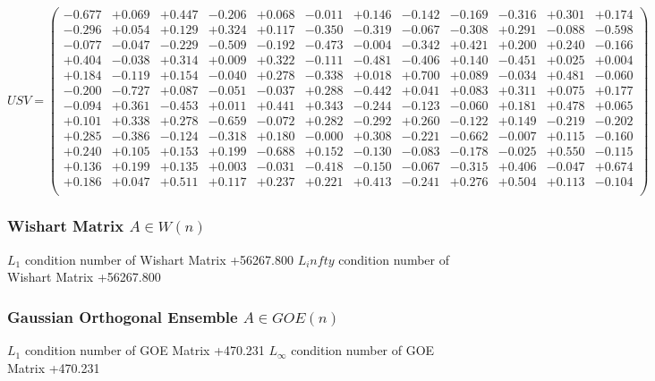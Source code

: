 \documentclass[9pt]{article}
\theoremstyle{plain}
\theoremstyle{definition}
\theoremstyle{remark}
\numberwithin{equation}{section}
\begin{document}
$U S V = \left(
\begin{array}{
cccccccccccc}
-0.677 & +0.069 & +0.447 & -0.206 & +0.068 & -0.011 & +0.146 & -0.142 & -0.169 & -0.316 & +0.301 & +0.174 \\
-0.296 & +0.054 & +0.129 & +0.324 & +0.117 & -0.350 & -0.319 & -0.067 & -0.308 & +0.291 & -0.088 & -0.598 \\
-0.077 & -0.047 & -0.229 & -0.509 & -0.192 & -0.473 & -0.004 & -0.342 & +0.421 & +0.200 & +0.240 & -0.166 \\
+0.404 & -0.038 & +0.314 & +0.009 & +0.322 & -0.111 & -0.481 & -0.406 & +0.140 & -0.451 & +0.025 & +0.004 \\
+0.184 & -0.119 & +0.154 & -0.040 & +0.278 & -0.338 & +0.018 & +0.700 & +0.089 & -0.034 & +0.481 & -0.060 \\
-0.200 & -0.727 & +0.087 & -0.051 & -0.037 & +0.288 & -0.442 & +0.041 & +0.083 & +0.311 & +0.075 & +0.177 \\
-0.094 & +0.361 & -0.453 & +0.011 & +0.441 & +0.343 & -0.244 & -0.123 & -0.060 & +0.181 & +0.478 & +0.065 \\
+0.101 & +0.338 & +0.278 & -0.659 & -0.072 & +0.282 & -0.292 & +0.260 & -0.122 & +0.149 & -0.219 & -0.202 \\
+0.285 & -0.386 & -0.124 & -0.318 & +0.180 & -0.000 & +0.308 & -0.221 & -0.662 & -0.007 & +0.115 & -0.160 \\
+0.240 & +0.105 & +0.153 & +0.199 & -0.688 & +0.152 & -0.130 & -0.083 & -0.178 & -0.025 & +0.550 & -0.115 \\
+0.136 & +0.199 & +0.135 & +0.003 & -0.031 & -0.418 & -0.150 & -0.067 & -0.315 & +0.406 & -0.047 & +0.674 \\
+0.186 & +0.047 & +0.511 & +0.117 & +0.237 & +0.221 & +0.413 & -0.241 & +0.276 & +0.504 & +0.113 & -0.104 \\
\end{array}
\right)$ \newline 

\subsubsection{Wishart Matrix $A \in W(n)$}
$L_1$ condition number of Wishart Matrix +56267.800
$L_infty$ condition number of Wishart Matrix +56267.800
\subsubsection{Gaussian Orthogonal Ensemble $A \in GOE(n)$}
$L_1$ condition number of GOE Matrix +470.231
$L_\infty$ condition number of GOE Matrix +470.231
\end{document}
